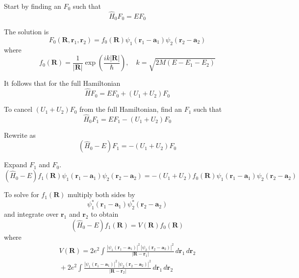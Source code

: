 \documentclass[12pt]{article}
\begin{document}
Start by finding an $F_0$ such that
\begin{equation*}
\hat H_0F_0=EF_0
\end{equation*}

The solution is
\begin{equation*}
F_0(\mathbf R,\mathbf r_1,\mathbf r_2)=f_0(\mathbf R)\psi_1(\mathbf r_1-\mathbf a_1)\psi_2(\mathbf r_2-\mathbf a_2)
\tag{1}
\end{equation*}
where
\begin{equation*}
f_0(\mathbf R)=\frac{1}{|\mathbf R|}\exp\left(\frac{ik|\mathbf R|}{\hbar}\right),\quad k=\sqrt{2M(E-E_1-E_2)}
\end{equation*}

It follows that for the full Hamiltonian
\begin{equation*}
\hat HF_0=EF_0+(U_1+U_2)F_0
\end{equation*}

To cancel $(U_1+U_2)F_0$ from the full Hamiltonian, find an $F_1$ such that
\begin{equation*}
\hat H_0F_1=EF_1-(U_1+U_2)F_0
\end{equation*}

Rewrite as
\begin{equation*}
\left(\hat H_0-E\right)F_1=-(U_1+U_2)F_0
\end{equation*}

Expand $F_1$ and $F_0$.
\begin{equation*}
\left(\hat H_0-E\right)f_1(\mathbf R)\psi_1(\mathbf r_1-\mathbf a_1)\psi_2(\mathbf r_2-\mathbf a_2)
=-(U_1+U_2)f_0(\mathbf R)\psi_1(\mathbf r_1-\mathbf a_1)\psi_2(\mathbf r_2-\mathbf a_2)
\end{equation*}

To solve for $f_1(\mathbf R)$ multiply both sides by
\begin{equation*}
\psi_1^*(\mathbf r_1-\mathbf a_1)\psi_2^*(\mathbf r_2-\mathbf a_2)
\end{equation*}
and integrate over $\mathbf r_1$ and $\mathbf r_2$ to obtain
\begin{equation*}
\left(\hat H_0-E\right)f_1(\mathbf R)
=V(\mathbf R)f_0(\mathbf R)
\tag{2}
\end{equation*}
where
\begin{multline*}
V(\mathbf R)
=2e^2\int\frac{|\psi_1(\mathbf r_1-\mathbf a_1)|^2\,|\psi_2(\mathbf r_2-\mathbf a_2)|^2}{|\mathbf R-\mathbf r_1|}
\,d\mathbf r_1\,d\mathbf r_2
\\
{}+2e^2\int\frac{|\psi_1(\mathbf r_1-\mathbf a_1)|^2\,|\psi_2(\mathbf r_2-\mathbf a_2)|^2}{|\mathbf R-\mathbf r_2|}
\,d\mathbf r_1\,d\mathbf r_2
\end{multline*}
\end{document}
